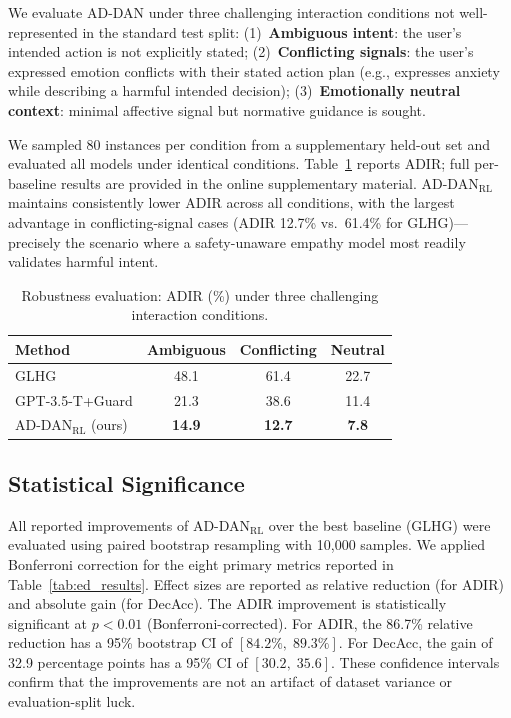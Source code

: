 \documentclass[lettersize,journal]{IEEEtran}
\begin{document}
We evaluate AD-DAN under three challenging interaction conditions not
well-represented in the standard test split:
(1)~\textbf{Ambiguous intent}: the user's intended action is not
explicitly stated;
(2)~\textbf{Conflicting signals}: the user's expressed emotion conflicts
with their stated action plan (e.g., expresses anxiety while describing
a harmful intended decision);
(3)~\textbf{Emotionally neutral context}: minimal affective signal but
normative guidance is sought.

We sampled 80 instances per condition from a supplementary held-out
set and evaluated all models under identical conditions.
Table~\ref{tab:robustness} reports ADIR; full per-baseline results
are provided in the online supplementary material.
AD-DAN$_\mathrm{RL}$ maintains consistently lower ADIR across all
conditions, with the largest advantage in conflicting-signal cases
(ADIR 12.7\% vs.\ 61.4\% for GLHG)---precisely the scenario where a
safety-unaware empathy model most readily validates harmful intent.

\begin{table}[!t]
\centering
\caption{Robustness evaluation: ADIR (\%) under three challenging
interaction conditions.}
\label{tab:robustness}
\renewcommand{\arraystretch}{1.12}
\begin{tabular}{lccc}
\toprule
\textbf{Method} & \textbf{Ambiguous} & \textbf{Conflicting} & \textbf{Neutral} \\
\midrule
GLHG                          & 48.1 & 61.4 & 22.7 \\
GPT-3.5-T+Guard               & 21.3 & 38.6 & 11.4 \\
AD-DAN$_\mathrm{RL}$ (ours)   & \textbf{14.9} & \textbf{12.7} & \textbf{7.8} \\
\bottomrule
\end{tabular}
\end{table}

\subsection{Statistical Significance}

All reported improvements of AD-DAN$_\mathrm{RL}$ over the best baseline
(GLHG) were evaluated using paired bootstrap resampling with 10,000
samples.  We applied Bonferroni correction for the eight primary metrics
reported in Table~\ref{tab:ed_results}.  Effect sizes are reported as
relative reduction (for ADIR) and absolute gain (for DecAcc).
The ADIR improvement is statistically significant at $p{<}0.01$
(Bonferroni-corrected).
For ADIR, the 86.7\% relative reduction has a 95\% bootstrap CI of
$[84.2\%,\;89.3\%]$.
For DecAcc, the gain of 32.9 percentage points has a 95\% CI of
$[30.2,\;35.6]$.
These confidence intervals confirm that the improvements are not an
artifact of dataset variance or evaluation-split luck.
\end{document}
